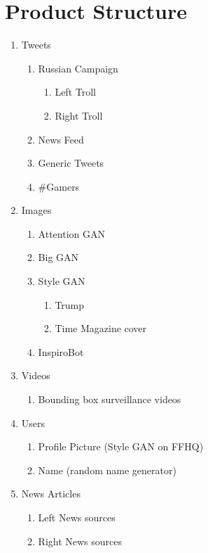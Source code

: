 \documentclass[12pt, letterpaper]{article}
\begin{document}
\section{Product Structure}

\begin{enumerate}

	\item Tweets
	\begin{enumerate}
		\item Russian Campaign
		\begin{enumerate}
			\item Left Troll
			\item Right Troll
		\end{enumerate}
		\item News Feed
		\item Generic Tweets
		\item \#{Gamers}
	\end{enumerate}
	
	\item Images
	\begin{enumerate}
		\item Attention GAN
		\item Big GAN
		\item Style GAN
		\begin{enumerate}
			\item Trump
			\item Time Magazine cover
		\end{enumerate}
		\item InspiroBot
	\end{enumerate}
	\item Videos
	\begin{enumerate}
		\item Bounding box surveillance videos
	\end{enumerate}
	\item Users
	\begin{enumerate}
		\item Profile Picture (Style GAN on FFHQ)
		\item Name (random name generator)
	\end{enumerate}
	\item News Articles
	\begin{enumerate}
		\item Left News sources
		\item Right News sources
	\end{enumerate}

\end{enumerate}
\end{document}
